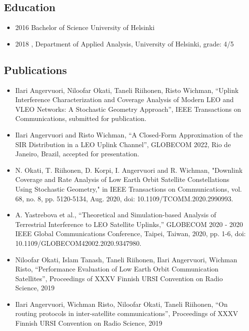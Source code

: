 \documentclass{article}
\begin{document}
        \subsection{Education}
        \begin{itemize}
        \item 2016 Bachelor of Science University of Helsinki\\
        \item 2018 , Department of Applied Analysis, University of Helsinki, grade: 4/5
          
        \end{itemize}

        
        
        \subsection{Publications}
        

        \begin{itemize}
        \item
          Ilari Angervuori,  Niloofar Okati, Taneli Riihonen,  Risto Wichman, ``Uplink Interference Characterization and Coverage Analysis of Modern {LEO} and {VLEO} Networks: A Stochastic Geometry Approach'', IEEE Transactions on Communications, submitted for publication.
        \item
          Ilari Angervuori and  Risto Wichman, ``A Closed-Form Approximation of the SIR
          Distribution in a LEO Uplink Channel'', GLOBECOM 2022, Rio de Janeiro, Brazil, accepted for presentation.
        \item
          N. Okati, T. Riihonen, D. Korpi, I. Angervuori and R. Wichman, "Downlink Coverage and Rate Analysis of Low Earth Orbit Satellite Constellations Using Stochastic Geometry," in IEEE Transactions on Communications, vol. 68, no. 8, pp. 5120-5134, Aug. 2020, doi: 10.1109/TCOMM.2020.2990993.
        \item A. Yastrebova et al., ``Theoretical and Simulation-based Analysis of Terrestrial Interference to LEO Satellite Uplinks,'' GLOBECOM 2020 - 2020 IEEE Global Communications Conference, Taipei, Taiwan, 2020, pp. 1-6, doi: 10.1109/GLOBECOM42002.2020.9347980.
        \item Niloofar Okati, Islam Tanash, Taneli Riihonen, Ilari Angervuori, Wichman Risto, ``Performance Evaluation of Low Earth Orbit Communication Satellites'', Proceedings of XXXV Finnish URSI Convention on Radio Science, 2019
        \item Ilari Angervuori, Wichman Risto, Niloofar Okati, Taneli Riihonen, ``On routing protocols in inter-satellite communications'', Proceedings of XXXV Finnish URSI Convention on Radio Science, 2019
          
        \end{itemize}
\end{document}
